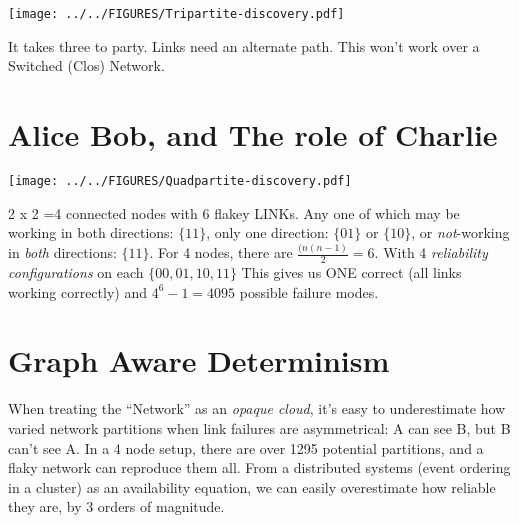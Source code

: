 \documentclass[../HFT-main.tex]{subfiles}
\begin{document}
 \begin{marginfigure}
        \texttt{[image: ../../FIGURES/Tripartite-discovery.pdf]}
  \caption{It takes three to party.  Links need an alternate path. This won't work over a Switched (Clos) Network.  
}
    \vspace{16pt}
\end{marginfigure}


\section{Alice  Bob,  and The role of Charlie}




 \begin{marginfigure}
      \texttt{[image: ../../FIGURES/Quadpartite-discovery.pdf]}
  \caption{2 x 2 =4  connected nodes with 6 flakey LINKs. Any one of which may be working in both directions: $\{11\}$, only one direction: $\{01\}$ or $\{10\}$, or \emph{not}-working in  \emph{both} directions: $\{11\}$. For 4 nodes, there are $\frac{(n(n-1)}{2} = 6$. With 4  \emph{reliability configurations} on each \LINK $\{00,01,10,11\}$ This gives us ONE correct (all links working correctly) and  $4^6-1 = 4095$ possible failure modes.}%
   \vspace{10pt}
\end{marginfigure}

\section{Graph Aware Determinism}


When treating the ``Network'' as an \emph{opaque cloud}, it's easy to underestimate how varied network partitions when link failures are 
asymmetrical:  A can see B, but B can't see A. In a 4 node setup, there are over 1295 potential partitions, and a flaky network can reproduce them all. %
From a distributed systems (event ordering in a cluster)  as an availability equation, we can easily overestimate how reliable they are, by 3 orders of magnitude.  
\end{document}

